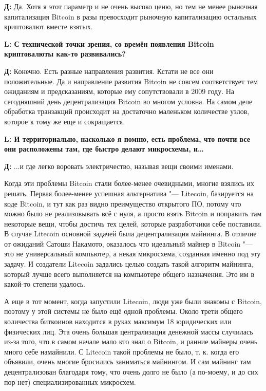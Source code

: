\documentclass[10pt, a5paper]{article}
\begin{document}
{\noindent \bf Д:} Да. Хотя я этот параметр и не очень высоко ценю, но тем не менее рыночная капитализация Bitcoin в разы превосходит рыночную капитализацию остальных криптовалют вместе взятых.

{\noindent \bf L: С технической точки зрения, со времён появления Bitcoin криптовалюты как-то развивались?}

{\noindent \bf Д:} Конечно. Есть разные направления развития. Кстати не все они положительные. Да и направление развития Bitcoin не совсем соответствует тем ожиданиям и предсказаниям, которые ему сопутствовали в 2009 году.  На сегодняшний день децентрализация Bitcoin во многом условна. На самом деле обработка транзакций происходит на достаточно маленьком количестве узлов, которое к тому же еще и сокращается.

{\noindent \bf L: И территориально, насколько я помню, есть проблема, что почти все они расположены там, где быстро делают микросхемы, и\ldots}

{\noindent \bf Д:} ...и где легко воровать электричество, называя вещи своими именами.

Когда эти проблемы Bitcoin стали более-менее очевидными, многие взялись их решать. Первая более-менее успешная альтернатива "--- Litecoin, базируется на коде Bitcoin, и тут как раз видно преимущество открытого ПО, потому что можно было не реализовывать всё с нуля, а просто взять Bitcoin и поправить там некоторые вещи, чтобы достичь тех целей, которые разработчики себе поставили. В случае Litecoin основной задачей была децентрализация майнинга. В отличие от ожиданий Сатоши Накамото, оказалось что идеальный майнер в Bitcoin "--- это не универсальный компьютер, а некая микросхема, созданная именно под эту задачу. И создатели Litecoin задались целью создать такой алгоритм майнинга, который лучше всего выполняется на компьютере общего назначения. Это им в какой-то степени удалось. 

А еще в тот момент, когда запустили Litecoin, люди уже были знакомы с Bitcoin, поэтому у этой системы не было ещё одной проблемы. Около трети общего количества биткоинов находится в руках максимум 18 юридических или физических лиц. Эта очень большая централизация денежной массы случилась из-за того, что в самом начале мало кто знал о Bitcoin, и ранние майнеры очень много себе намайнили. С Litecoin такой проблемы не было, т. к. когда его объявили, очень многие бросились заниматься майнингом. И сам майнинг там децентрализован благодаря тому, что очень долго не было (а по-моему, и до сих пор нет) специализированных микросхем. 
\end{document}
